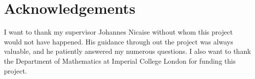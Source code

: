 \documentclass[12pt]{article}
\begin{document}






\section*{Acknowledgements}
I want to thank my supervisor Johannes Nicaise without whom this project
would not have happened. His guidance through out the project was always
valuable, and he patiently answered my numerous questions. I also want to
thank the Department of Mathematics at Imperial College London for funding
this project.



\end{document}
